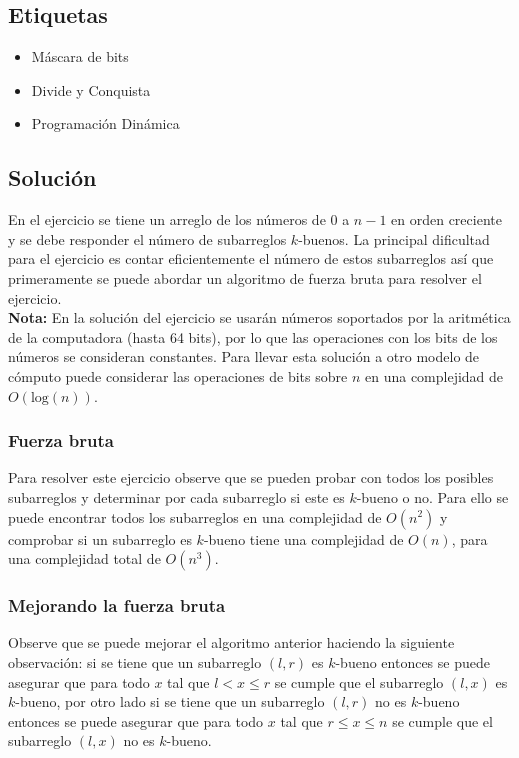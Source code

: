 \documentclass{article}
\begin{document}
\subsection{Etiquetas}

\begin{itemize}
    \item Máscara de bits
    \item Divide y Conquista
    \item Programación Dinámica
\end{itemize}

\subsection{Solución}

En el ejercicio se tiene un arreglo de los números de 0 a $n-1$ en orden creciente y se debe responder el número de subarreglos
$k$-buenos. La principal dificultad para el ejercicio es contar eficientemente el número de estos subarreglos así que primeramente
se puede abordar un algoritmo de fuerza bruta para resolver el ejercicio.\\

\textbf{Nota:} En la solución del ejercicio se usarán números soportados por la aritmética de la computadora (hasta 64 bits),
por lo que las operaciones con los bits de los números se consideran constantes. Para llevar esta solución a otro modelo de cómputo
puede considerar las operaciones de bits sobre $n$ en una complejidad de $O(\text{log}(n))$.

\subsubsection{Fuerza bruta}

Para resolver este ejercicio observe que se pueden probar con todos los posibles subarreglos y determinar por cada subarreglo
si este es $k$-bueno o no. Para ello se puede encontrar todos los subarreglos en una complejidad de $O(n^2)$ y comprobar si un
subarreglo es $k$-bueno tiene una complejidad de $O(n)$, para una complejidad total de $O(n^3)$.

\subsubsection{Mejorando la fuerza bruta}

Observe que se puede mejorar el algoritmo anterior haciendo la siguiente observación: si se tiene que un subarreglo $(l,r)$ es $k$-bueno
entonces se puede asegurar que para todo $x$ tal que $l<x\leq r$ se cumple que el subarreglo $(l,x)$ es $k$-bueno, por otro lado si se
tiene que un subarreglo $(l,r)$ no es $k$-bueno entonces se puede asegurar que para todo $x$ tal que $r\leq x\leq n$ se cumple que el subarreglo
$(l,x)$ no es $k$-bueno.
\end{document}

